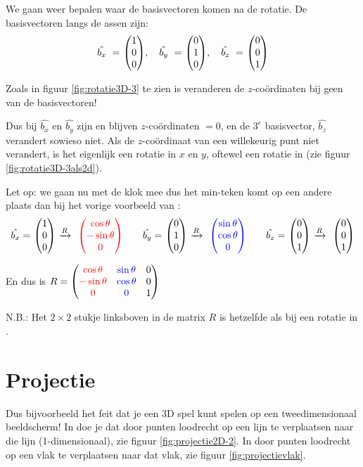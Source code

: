 

We gaan weer bepalen waar de basisvectoren komen na de rotatie. De basisvectoren langs de assen zijn: 
\[
    \hat{b_x}\ =\ \vecdrie{1}{0}{0}, \quad \hat{b_y}\ =\ \vecdrie{0}{1}{0}, \quad \hat{b_z}\ =\ \vecdrie{0}{0}{1}
\]

Zoals in figuur \ref{fig:rotatie3D-3} te zien is veranderen de $z$-coördinaten bij geen van de basisvectoren! 

Dus bij  $ \hat{b_x} $ en $  \hat{b_y} $  zijn en blijven $z$-coördinaten $= 0$, en de $3^e$ basisvector, $\hat{b_z}$ verandert sowieso niet. Als de $z$-coördinaat van een willekeurig punt niet verandert, is het eigenlijk een rotatie in $x$ en $y$, oftewel een rotatie in \RT (zie figuur \ref{fig:rotatie3D-3als2d}).  


Let op: we gaan nu met de klok mee dus het min-teken komt op een andere plaats dan bij het vorige voorbeeld van \RT: 
\[
    \hat{b_x} =\ \vecdrie{1}{0}{0} \ \xrightarrow{R} \ \ \vecdrie[red]{\cos \theta}{- \sin \theta}{0} \qquad 
    \hat{b_y} =\ \vecdrie{0}{1}{0} \ \xrightarrow{R} \ \ \vecdrie[blue]{\sin \theta}{ \cos \theta}{0} \qquad
    \hat{b_z} =\ \vecdrie{0}{0}{1} \ \xrightarrow{R} \ \ \vecdrie{0}{0}{1}
\]

En dus is $R = \begin{pmatrix} {\color{red}\cos \theta} & {\color{blue}\sin \theta} & {0}  \\ {\color{red}- \sin \theta} & {\color{blue}\cos \theta} & {0} \\ {\color{red}0} & {\color{blue}0} & {1} \end{pmatrix} $

N.B.: Het $2\times2$ stukje linksboven in de matrix $R$ is hetzelfde als bij een rotatie in \RT.

\section{Projectie}		
 Dus bijvoorbeeld het feit dat je een 3D spel kunt spelen op een tweedimensionaal beeldscherm! In \RT doe je dat door punten loodrecht op een lijn te verplaatsen naar die lijn (1-dimensionaal), zie figuur \ref{fig:projectie2D-2}. In \RD door punten loodrecht op een vlak te verplaatsen naar dat vlak, zie figuur \ref{fig:projectievlak}.

